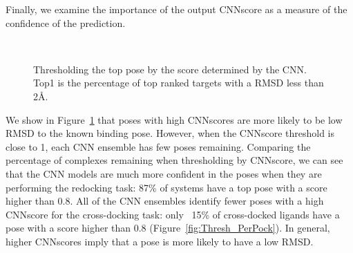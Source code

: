 \documentclass[linenumbers,doublespacing]{bmcart}
\begin{document}
Finally, we examine the importance of the output CNNscore as a measure of the confidence of the prediction. 
\begin{figure}[tbh]
            \\
	\caption{Thresholding the top pose by the score determined by the CNN. Top1 is the percentage of top ranked targets with a RMSD less than 2{\AA}.}
	\label{fig:ScoreThresh}
\end{figure} 

We show in Figure~\ref{fig:ScoreThresh} that poses with high CNNscores are more likely to be low RMSD to the known binding pose. However, when the CNNscore threshold is close to 1, each CNN ensemble has few poses remaining. Comparing the percentage of complexes remaining when thresholding by CNNscore, we can see that the CNN models are much more confident in the poses when they are performing the redocking task: 87\% of systems have a top pose with a score higher than 0.8. All of the CNN ensembles identify fewer poses with a high CNNscore for the cross-docking task: only ~15\% of cross-docked ligands have a pose with a score higher than 0.8 (Figure~\ref{fig:Thresh_PerPock}). In general, higher CNNscores imply that a pose is more likely to have a low RMSD. 
\end{document}
